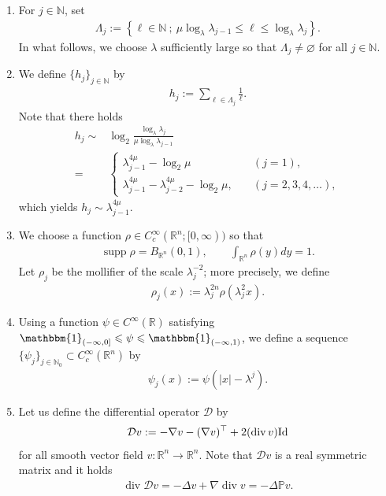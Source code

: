 \documentclass[a4paper,12pt,reqno]{amsart}
\theoremstyle{plain}
\theoremstyle{definition}
\renewcommand{\div}{\operatorname{div}}
\newcommand{\supp}{\operatorname{supp}}
\renewcommand{\leq}{\leqslant}
\newcommand{\Id}{{\rm Id}}
\newcommand{\R}{\mathbb{R}}
\newcommand{\N}{\mathbb{N}}
\newcommand{\Mp}[1]{\left\{#1\right\}}
\renewcommand{\sp}[1]{\left(#1\right)}
\newcommand{\bb}{\mathbbm}
\begin{document}
\begin{enumerate}[label=\arabic*.]
Throughout this section, $\lambda$ may be replaced by a larger dyadic number whenever necessary, without further comment. We emphasize that the required lower bound on $\lambda$ is chosen independently of $j$. 
Moreover, almost all quantities introduced below depend on the parameter $\lambda$; however, we do not record this dependence explicitly in their notations so as to avoid unnecessarily complicating them.
We also note that the generic constants are always independent of $\lambda$ and $j$.
\item 
For $j \in \N$, set 
\begin{align}
    \Lambda_j:=
    \Mp{\ell \in \N\ ;\ \mu \log_{\lambda}\lambda_{j-1} \leq \ell \leq \log_{\lambda} \lambda_j}.
\end{align}
In what follows, we choose $\lambda$ sufficiently large so that $\Lambda_j \neq \varnothing$ for all $j \in \N$.
\item 
We define $\{h_j\}_{j \in \N}$ by
\begin{align}
    h_j:=
    \sum_{\ell \in \Lambda_j}
    \frac{1}{\ell}.
\end{align}
Note that there holds
\begin{align}
    h_j 
    \sim{}& 
    \log_2 
    \frac{\log_\lambda\lambda_j}{\mu\log_\lambda\lambda_{j-1}}
    \\
    ={}&
    \begin{cases}
        \lambda_{j-1}^{4\mu}-\log_2\mu & (j=1), \\
        \lambda_{j-1}^{4\mu}-\lambda_{j-2}^{4\mu}-\log_2\mu, \quad & (j =2,3,4,\dots),
    \end{cases}
\end{align}
which yields $h_j \sim \lambda_{j-1}^{4\mu}$.
\item 
We choose a function $\rho \in C_c^{\infty}(\mathbb{R}^n;[0,\infty))$ so that
\begin{align}
    \supp \rho = B_{\R^n}(0,1), 
    \qquad
    \int_{\R^n} \rho(y) dy = 1.
\end{align}
Let $\rho_{j}$ be the mollifier of the scale $\lambda_j^{-2}$; more precisely, we define
\begin{align}
    \rho_{j}(x):=\lambda_j^{2n}\rho\sp{\lambda_j^2x}.
\end{align}
\item 
Using a function $\psi \in C^{\infty}(\R)$ satisfying $\bb{1}_{(-\infty,0]} \leq \psi \leq \bb{1}_{(-\infty,1)}$, we define a sequence $\{ \psi_{j} \}_{j \in \N_0} \subset C_c^{\infty}(\R^n)$ by
\begin{align}
    \psi_{j}(x)
    :=
    \psi(|x|-\lambda^j).
\end{align}
\item 
Let us define the differential operator $\mathcal{D}$ by
\begin{align}
    \mathcal{D}v:=-\nabla v - (\nabla v)^{\top} + 2 (\div v) \Id 
\end{align}
for all smooth vector field $v:\R^n \to \R^n$.
Note that $\mathcal{D}v$ is a real symmetric matrix and it holds
\begin{align}
    \div \mathcal{D}v = -\Delta v + \nabla \div v = -\Delta \mathbb{P} v.
\end{align}
\end{enumerate}
\end{document}
